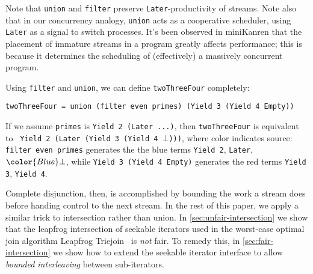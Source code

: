 \documentclass[acmsmall,screen,dvipsnames,svgnames]{acmart}
\newcommand\hask[1]{\texttt{#1}}
\newcommand\ttt\texttt
\newcommand\todo[1]{{\color{Orange}#1}}
\renewcommand\todo[1]{{\color{IndianRed}#1}}
\newcommand\oldtodo[1]{\todo{#1}}
\renewcommand\todo[1]{\ignorespaces}
\begin{document}
\noindent
Note that \ttt{union} and \ttt{filter} preserve \hask{Later}-productivity of streams.
Note also that in our concurrency analogy, \ttt{union} acts as a cooperative scheduler, using \hask{Later} as a signal to switch processes.
It's been observed in miniKanren that the placement of immature streams in a program greatly affects performance; this is because it determines the scheduling of (effectively) a massively concurrent program.

Using \ttt{filter} and \ttt{union}, we can define \ttt{twoThreeFour} completely:

\begin{verbatim}
twoThreeFour = union (filter even primes) (Yield 3 (Yield 4 Empty))
\end{verbatim}

\noindent
If we assume \ttt{primes} is \ttt{Yield 2 (Later ...)}, then \ttt{twoThreeFour} is equivalent to \ttt{\color{Blue} Yield 2 (Later {\color{Red}(Yield 3 (Yield 4 {\color{Blue}$\bot$}))})}, where color indicates source: \ttt{filter even primes} generates the the blue terms \ttt{\color{Blue}Yield 2}, \ttt{\color{Blue}Later}, $\color{Blue}\bot$, while \ttt{Yield 3 (Yield 4 Empty)} generates the red terms \ttt{\color{Red}Yield 3}, \ttt{\color{Red}Yield 4}.

Complete disjunction, then, is accomplished by bounding the work a stream does before handing control to the next stream.
In the rest of this paper, we apply a similar trick to intersection rather than union.
In \cref{sec:unfair-intersection} we show that the leapfrog intersection of seekable iterators used in the worst-case optimal join algorithm Leapfrog Triejoin~\citep{lftj} is \emph{not} fair.
To remedy this, in \cref{sec:fair-intersection} we show how to extend the seekable iterator interface to allow \emph{bounded interleaving} between sub-iterators.
\oldtodo{TODO: rephrase `bounded interleaving'?}
\todo{TODO: need a section where we explain bounded fairness and how that serves as the analogy for the conjunctive fairness we seek to achieve.}



\end{document}
